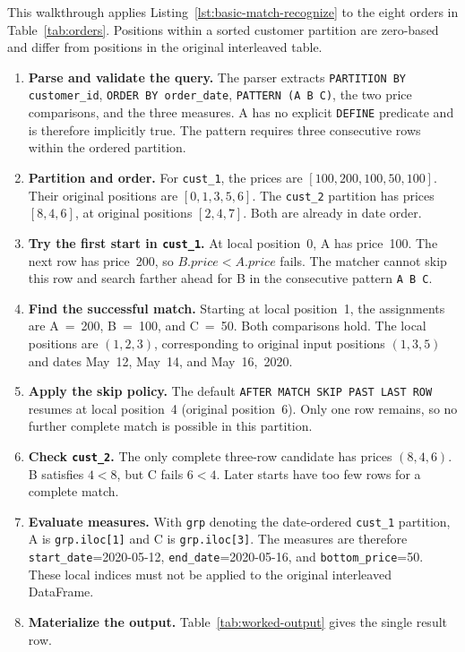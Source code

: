 \documentclass[preprint,12pt,times,a4paper]{elsarticle}
\begin{document}
This walkthrough applies Listing~\ref{lst:basic-match-recognize} to the eight
orders in Table~\ref{tab:orders}. Positions within a sorted customer partition
are zero-based and differ from positions in the original interleaved table.

\begin{enumerate}
  \item \textbf{Parse and validate the query.} The parser extracts
    \texttt{PARTITION BY customer\_id}, \texttt{ORDER BY order\_date},
    \texttt{PATTERN (A B C)}, the two price comparisons, and the three
    measures. A has no explicit \texttt{DEFINE} predicate and is therefore
    implicitly true. The pattern requires three consecutive rows within the
    ordered partition.

  \item \textbf{Partition and order.} For \texttt{cust\_1}, the prices are $[100,200,100,50,100]$. Their original positions are
    $[0,1,3,5,6]$. The \texttt{cust\_2} partition has prices $[8,4,6]$,
    at original positions $[2,4,7]$. Both are already in date order.

  \item \textbf{Try the first start in \texttt{cust\_1}.} At local
    position~0, A has price~100. The next row has price~200, so
    $B.price<A.price$ fails. The matcher cannot skip this row and search
    farther ahead for B in the consecutive pattern \texttt{A B C}.

  \item \textbf{Find the successful match.} Starting at local position~1,
    the assignments are A~=~200, B~=~100, and C~=~50. Both comparisons hold.
    The local positions are $(1,2,3)$, corresponding to original input
    positions $(1,3,5)$ and dates May~12, May~14, and May~16,~2020.

  \item \textbf{Apply the skip policy.} The default
    \texttt{AFTER MATCH SKIP PAST LAST ROW} resumes at local position~4
    (original position~6). Only one row remains, so no further complete
    match is possible in this partition.

  \item \textbf{Check \texttt{cust\_2}.} The only complete three-row
    candidate has prices $(8,4,6)$. B satisfies $4<8$, but C fails
    $6<4$. Later starts have too few rows for a complete match.

  \item \textbf{Evaluate measures.} With \texttt{grp} denoting the
    date-ordered \texttt{cust\_1} partition, A is \texttt{grp.iloc[1]}
    and C is \texttt{grp.iloc[3]}. The measures are therefore
    \texttt{start\_date}=2020-05-12, \texttt{end\_date}=2020-05-16,
    and \texttt{bottom\_price}=50. These local indices must not be applied
    to the original interleaved DataFrame.

  \item \textbf{Materialize the output.} Table~\ref{tab:worked-output}
    gives the single result row.
\end{enumerate}
\end{document}

